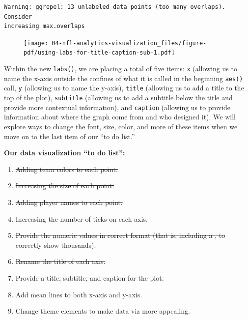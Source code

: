 \documentclass[
  letterpaper,
]{krantz}
\begin{document}
\begin{verbatim}
Warning: ggrepel: 13 unlabeled data points (too many overlaps). Consider
increasing max.overlaps
\end{verbatim}

\begin{figure}[H]

{\centering \texttt{[image: 04-nfl-analytics-visualization\_files/figure-pdf/using-labs-for-title-caption-sub-1.pdf]}

}

\end{figure}

Within the new \texttt{labs()}, we are placing a total of five items:
\texttt{x} (allowing us to name the x-axis outside the confines of what
it is called in the beginning \texttt{aes()} call, \texttt{y} (allowing
us to name the y-axis), \texttt{title} (allowing us to add a title to
the top of the plot), \texttt{subtitle} (allowing us to add a subtitle
below the title and provide more contextual information), and
\texttt{caption} (allowing us to provide information about where the
graph come from and who designed it). We will explore ways to change the
font, size, color, and more of these items when we move on to the last
item of our ``to do list.''

\begin{tcolorbox}[enhanced jigsaw, colback=white, leftrule=.75mm, breakable, colframe=quarto-callout-note-color-frame, bottomtitle=1mm, rightrule=.15mm, left=2mm, opacityback=0, bottomrule=.15mm, arc=.35mm, coltitle=black, colbacktitle=quarto-callout-note-color!10!white, toptitle=1mm, titlerule=0mm, title=\textcolor{quarto-callout-note-color}{\faInfo}\hspace{0.5em}{Note}, toprule=.15mm, opacitybacktitle=0.6]

\textbf{Our data visualization ``to do list'':}

\begin{enumerate}
\def\labelenumi{\arabic{enumi}.}
\item
  \st{Adding team colors to each point.}
\item
  \st{Increasing the size of each point.}
\item
  \st{Adding player names to each point.}
\item
  \st{Increasing the number of ticks on each axis.}
\item
  \st{Provide the numeric values in correct format (that is, including a
  , to correctly show thousands).}
\item
  \st{Rename the title of each axis.}
\item
  \st{Provide a title, subtitle, and caption for the plot.}
\item
  Add mean lines to both x-axis and y-axis.
\item
  Change theme elements to make data viz more appealing.
\end{enumerate}

\end{tcolorbox}
\end{document}
